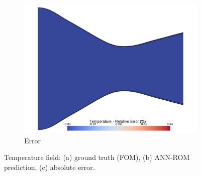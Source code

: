 \documentclass[tg, EN]{ufabcFHZh_tg}
\begin{document}
\begin{figure}[H]
\begin{subfigure}[b]{0.32\textwidth}
        \includegraphics[width=\textwidth]{Figuras/nn_error_temperature.pdf}
        \caption{Error}
    \end{subfigure}
    \caption{Temperature field: (a) ground truth (FOM), (b) ANN-ROM prediction, (c) absolute error.}
    \label{fig:nn_reconstruction_temperature}
\end{figure}
\end{document}

